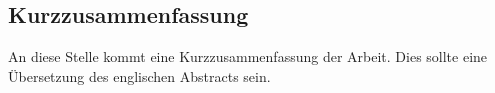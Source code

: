 \subsection*{Kurzzusammenfassung}
An diese Stelle kommt eine Kurzzusammenfassung der Arbeit.
Dies sollte eine Übersetzung des englischen Abstracts sein.

